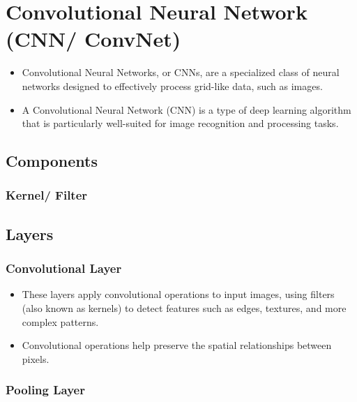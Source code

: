 \chapter{Convolutional Neural Network (CNN/ ConvNet) \cite{gfg-convolutional-neural-network-cnn-in-machine-learning}}\label{Convolutional Neural Network}

\begin{itemize}
    \item Convolutional Neural Networks, or CNNs, are a specialized class of neural networks designed to effectively process grid-like data, such as images.

    \item A Convolutional Neural Network (CNN) is a type of deep learning algorithm that is particularly well-suited for image recognition and processing tasks.
\end{itemize}


\section{Components}
\subsection{Kernel/ Filter}


\section{Layers}
\subsection{Convolutional Layer \cite{gfg-convolutional-neural-network-cnn-in-machine-learning}}\label{cnn: Convolutional layer}

\begin{itemize}
    \item These layers apply convolutional operations to input images, using filters (also known as kernels) to detect features such as edges, textures, and more complex patterns. 
    
    \item Convolutional operations help preserve the spatial relationships between pixels.
\end{itemize}


\subsection{Pooling Layer \cite{gfg-convolutional-neural-network-cnn-in-machine-learning}}\label{cnn: Pooling Layer}

